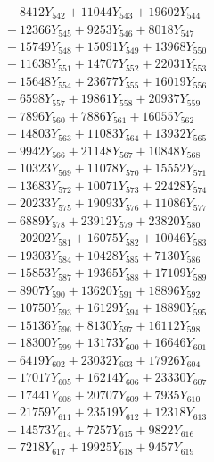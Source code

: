 \documentclass[a4paper,10pt]{article}
\begin{document}
{\begin{align}
&\;  + 8412 Y_{542} + 11044 Y_{543} + 19602 Y_{544} \\[0.3ex]
&\;  + 12366 Y_{545} + 9253 Y_{546} + 8018 Y_{547} \\[0.3ex]
&\;  + 15749 Y_{548} + 15091 Y_{549} + 13968 Y_{550} \\[0.3ex]
&\;  + 11638 Y_{551} + 14707 Y_{552} + 22031 Y_{553} \\[0.3ex]
&\;  + 15648 Y_{554} + 23677 Y_{555} + 16019 Y_{556} \\[0.3ex]
&\;  + 6598 Y_{557} + 19861 Y_{558} + 20937 Y_{559} \\[0.3ex]
&\;  + 7896 Y_{560} + 7886 Y_{561} + 16055 Y_{562} \\[0.3ex]
&\;  + 14803 Y_{563} + 11083 Y_{564} + 13932 Y_{565} \\[0.3ex]
&\;  + 9942 Y_{566} + 21148 Y_{567} + 10848 Y_{568} \\[0.5ex]\allowbreak
&\;  + 10323 Y_{569} + 11078 Y_{570} + 15552 Y_{571} \\[0.3ex]
&\;  + 13683 Y_{572} + 10071 Y_{573} + 22428 Y_{574} \\[0.3ex]
&\;  + 20233 Y_{575} + 19093 Y_{576} + 11086 Y_{577} \\[0.3ex]
&\;  + 6889 Y_{578} + 23912 Y_{579} + 23820 Y_{580} \\[0.3ex]
&\;  + 20202 Y_{581} + 16075 Y_{582} + 10046 Y_{583} \\[0.3ex]
&\;  + 19303 Y_{584} + 10428 Y_{585} + 7130 Y_{586} \\[0.3ex]
&\;  + 15853 Y_{587} + 19365 Y_{588} + 17109 Y_{589} \\[0.3ex]
&\;  + 8907 Y_{590} + 13620 Y_{591} + 18896 Y_{592} \\[0.3ex]
&\;  + 10750 Y_{593} + 16129 Y_{594} + 18890 Y_{595} \\[0.3ex]
&\;  + 15136 Y_{596} + 8130 Y_{597} + 16112 Y_{598} \\[0.5ex]\allowbreak
&\;  + 18300 Y_{599} + 13173 Y_{600} + 16646 Y_{601} \\[0.3ex]
&\;  + 6419 Y_{602} + 23032 Y_{603} + 17926 Y_{604} \\[0.3ex]
&\;  + 17017 Y_{605} + 16214 Y_{606} + 23330 Y_{607} \\[0.3ex]
&\;  + 17441 Y_{608} + 20707 Y_{609} + 7935 Y_{610} \\[0.3ex]
&\;  + 21759 Y_{611} + 23519 Y_{612} + 12318 Y_{613} \\[0.3ex]
&\;  + 14573 Y_{614} + 7257 Y_{615} + 9822 Y_{616} \\[0.3ex]
&\;  + 7218 Y_{617} + 19925 Y_{618} + 9457 Y_{619} \\[0.3ex]

\end{align}}
\end{document}
